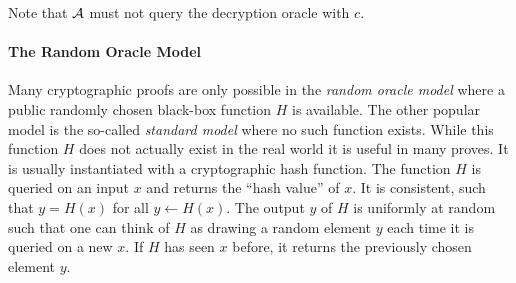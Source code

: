 \noindent
Note that $\mathcal{A}$ must not query the decryption oracle with $c$.

\paragraph{The Random Oracle Model}
Many cryptographic proofs are only possible in the \emph{random oracle model} where a public randomly chosen black-box function $H$ is available.
The other popular model is the so-called \emph{standard model} where no such function exists.
While this function $H$ does not actually exist in the real world it is useful in many proves.
It is usually instantiated with a cryptographic hash function.
The function $H$ is queried on an input $x$ and returns the ``hash value'' of $x$.
It is consistent, such that $y=H(x)$ for all $y\gets H(x)$.
The output $y$ of $H$ is uniformly at random such that one can think of $H$ as drawing a random element $y$ each time it is queried on a new $x$.
If $H$ has seen $x$ before, it returns the previously chosen element $y$.

